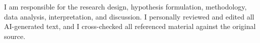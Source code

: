 \documentclass[
11pt, %
english, %
onehalfspacing, %
headsepline, %
]{MastersDoctoralThesis} %
\begin{document}
I am responsible for the research design, hypothesis formulation, methodology, data analysis, interpretation, and discussion. I personally reviewed and edited all AI-generated text, and I cross-checked all referenced material against the original source.


\tableofcontents


\mainmatter %

\pagestyle{thesis} %











\appendix %




%


\printbibliography[heading=bibintoc]

\end{document}
